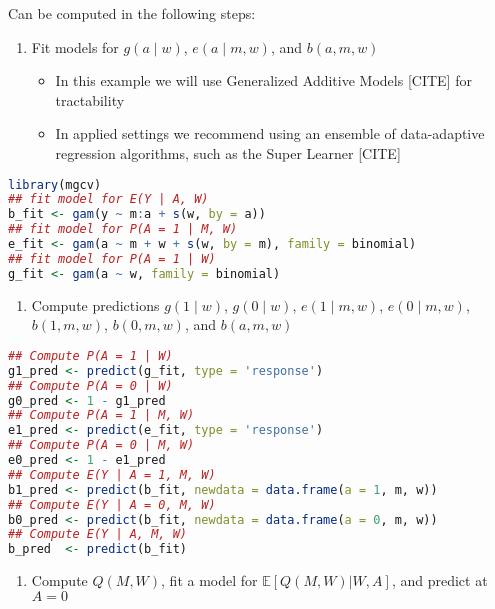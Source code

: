 \documentclass[
  12pt,
]{book}
\providecommand{\tightlist}{%
  \setlength{\itemsep}{0pt}\setlength{\parskip}{0pt}}
\theoremstyle{definition}
\theoremstyle{definition}
\theoremstyle{definition}
\newcommand{\E}{\mathbb{E}}
\newcommand{\1}{\mathbbm{1}}
\begin{document}
Can be computed in the following steps:

\begin{enumerate}
\def\labelenumi{\arabic{enumi}.}
\tightlist
\item
  Fit models for \(g(a\mid w)\), \(e(a\mid m, w)\), and \(b(a, m, w)\)

  \begin{itemize}
  \tightlist
  \item
    In this example we will use Generalized Additive Models {[}CITE{]} for
    tractability
  \item
    In applied settings we recommend using an ensemble of data-adaptive
    regression algorithms, such as the Super Learner {[}CITE{]}
  \end{itemize}
\end{enumerate}

\begin{lstlisting}[language=R]
library(mgcv)
## fit model for E(Y | A, W)
b_fit <- gam(y ~ m:a + s(w, by = a))
## fit model for P(A = 1 | M, W)
e_fit <- gam(a ~ m + w + s(w, by = m), family = binomial)
## fit model for P(A = 1 | W)
g_fit <- gam(a ~ w, family = binomial)
\end{lstlisting}

\begin{enumerate}
\def\labelenumi{\arabic{enumi}.}
\setcounter{enumi}{1}
\tightlist
\item
  Compute predictions \(g(1\mid w)\), \(g(0\mid w)\), \(e(1\mid m, w)\),
  \(e(0\mid m, w)\),\(b(1, m, w)\), \(b(0, m, w)\), and \(b(a, m, w)\)
\end{enumerate}

\begin{lstlisting}[language=R]
## Compute P(A = 1 | W)
g1_pred <- predict(g_fit, type = 'response')
## Compute P(A = 0 | W)
g0_pred <- 1 - g1_pred
## Compute P(A = 1 | M, W)
e1_pred <- predict(e_fit, type = 'response')
## Compute P(A = 0 | M, W)
e0_pred <- 1 - e1_pred
## Compute E(Y | A = 1, M, W)
b1_pred <- predict(b_fit, newdata = data.frame(a = 1, m, w))
## Compute E(Y | A = 0, M, W)
b0_pred <- predict(b_fit, newdata = data.frame(a = 0, m, w))
## Compute E(Y | A, M, W)
b_pred  <- predict(b_fit)
\end{lstlisting}

\begin{enumerate}
\def\labelenumi{\arabic{enumi}.}
\setcounter{enumi}{2}
\tightlist
\item
  Compute \(Q(M, W)\), fit a model for \(\E[Q(M,W) | W,A]\), and predict at \(A=0\)
\end{enumerate}
\end{document}
